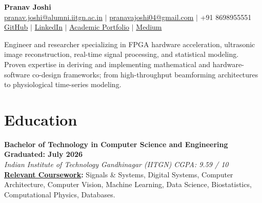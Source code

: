 \documentclass[10pt,a4paper]{article}
\begin{document}
\begin{center}
    {\LARGE \textbf{Pranav Joshi}} \\[4pt]
    \href{mailto:pranav.joshi@alumni.iitgn.ac.in}{pranav.joshi@alumni.iitgn.ac.in} $\vert{}$
    \href{mailto:pranavajoshi04@gmail.com}{pranavajoshi04@gmail.com} $\vert{}$
    +91 8698955551 \\[2pt]
    \href{https://github.com/pranav-joshi-iitgn}{GitHub} $\vert{}$
    \href{https://www.linkedin.com/in/pranav-joshi-77487b232}{LinkedIn} $\vert{}$
    \href{https://pranavjoshiiitgn.notion.site/54b8560288a346d39574e2b4cd6959ad?v=12b71196f4794d6485295473ab547e0f}{Academic Portfolio} $\vert{}$
    \href{https://medium.com/@pranav.joshi_16395}{Medium}
\end{center}

\vspace{2pt}
Engineer and researcher specializing in FPGA hardware acceleration, ultrasonic image reconstruction, real-time signal processing, and statistical modeling. 
Proven expertise in deriving and implementing mathematical and hardware-software co-design frameworks; from high-throughput beamforming architectures to physiological time-series modeling.

\section{Education}
\textbf{Bachelor of Technology in Computer Science and Engineering} \hfill \textbf{Graduated: July 2026} \\
\textit{Indian Institute of Technology Gandhinagar (IITGN)} \hfill \textit{CGPA: 9.59 / 10} \\
\textbf{\href{https://pranavjoshiiitgn.notion.site/54b8560288a346d39574e2b4cd6959ad?v=12b71196f4794d6485295473ab547e0f}{Relevant Coursework}:} Signals \& Systems, Digital Systems, Computer Architecture, Computer Vision, Machine Learning, Data Science, Biostatistics, Computational Physics, Databases.

\end{document}
